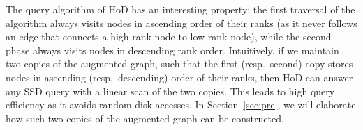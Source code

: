 \documentclass{sig-alternate}
\def\vgap{\vspace{0mm}}
\def\G{G^*}
\def\GC{G_c}
\begin{document}
\begin{sloppy}
\vgap

The query algorithm of HoD has an interesting property: the first traversal of the algorithm always visits nodes in ascending order of their ranks (as it never follows an edge that connects a high-rank node to low-rank node), while the second phase always visits nodes in descending rank order. Intuitively, if we maintain two copies of the augmented graph, such that the first (resp.\ second) copy stores nodes in ascending (resp.\ descending) order of their ranks, then HoD can answer any SSD query with a linear scan of the two copies. This leads to high query efficiency as it avoids random disk accesses. In Section~\ref{sec:pre}, we will elaborate how such two copies of the augmented graph can be constructed.


%
%

\end{sloppy}
\end{document}
